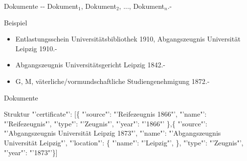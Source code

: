 \documentclass[12pt]{beamer}
\begin{document}
\begin{large}
\begin{frame}{Dokumente}
 -{}- Dokument$_1$, Dokument$_2$, ..., Dokument$_n$.-

 \vspace*{\fill}
 \begin{block}{Beispiel}
  \normalsize
  \begin{itemize}
   \item Entlastungsschein Universitätsbibliothek 1910, Abgangszeugnis Universität Leipzig 1910.-
   \item Abgangszeugnis Universitätsgericht Leipzig 1842.-
   \item G, M, väterliche/vormundschaftliche Studiengenehmigung 1872.-
  \end{itemize}
 \end{block}
\end{frame}


\begin{frame}{Dokumente}
 \begin{block}{Struktur}
  \normalsize
  \hspace*{0.5cm} 
  "'certificate"': [\{
\newline 
\hspace*{1cm}"'source"': "'Reifezeugnis 1866"',
\newline 
\hspace*{1cm}"'name"': "'Reifezeugnis"',
\newline 
\hspace*{1cm}"'type"': "'Zeugnis"',
\newline 
\hspace*{1cm}"'year"': "'1866"'
\newline 
\hspace*{0.5cm}\},\{
\newline 
\hspace*{1cm}"'source"': "'Abgangszeugnis Universität Leipzig 1873"',
\newline 
\hspace*{1cm}"'name"': "'Abgangszeugnis Universität Leipzig"',
\newline 
\hspace*{1cm}"'location"': \{
\newline 
\hspace*{1cm}\hspace*{0.5cm}"'name"': "'Leipzig"',
\newline 
\hspace*{1cm}\},
\newline 
\hspace*{1cm}"'type"': "'Zeugnis"',
\newline 
\hspace*{1cm}"'year"': "'1873"'\}]
 \end{block} 
\end{frame}



\end{large}
\end{document}

